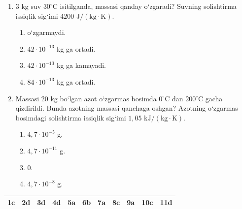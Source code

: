 \begin{enumerate}
\item 3 kg suv $30^\circ\text{C}$ isitilganda, massasi qanday o‘zgaradi? Suvning solishtirma issiqlik sig‘imi $4200\text{ J}/(\text{kg}\cdot\text{K})$.
\begin{enumerate}[label=\Alph*)]
\item o‘zgarmaydi.
\item $42\cdot 10^{-13}$ kg ga ortadi.
\item $42\cdot 10^{-13}$ kg ga kamayadi.
\item $84\cdot 10^{-13}$ kg ga ortadi.
\end{enumerate}

\item Massasi 20 kg bo‘lgan azot o‘zgarmas bosimda $0^\circ\text{C}$ dan $200^\circ\text{C}$ gacha qizdirildi. Bunda azotning massasi qanchaga oshgan? Azotning o‘zgarmas bosimdagi solishtirma issiqlik sig‘imi $1,05\text{ kJ}/(\text{kg}\cdot\text{K})$.
\begin{enumerate}[label=\Alph*)]
\item $4,7\cdot 10^{-5}$ g.
\item $4,7\cdot 10^{-11}$ g.
\item 0.
\item $4,7\cdot 10^{-8}$ g.
\end{enumerate}

\end{enumerate}


\begin{table}[!ht]
\centering
\begin{tabular}{|c|c|c|c|c|c|c|c|c|c|c|}
\hline
1c & 2d & 3d & 4d & 5a & 6b & 7a & 8c & 9a & 10c & 11d \\ \hline
\end{tabular}
\end{table}
